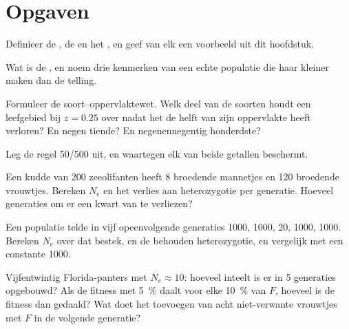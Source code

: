 \section{Opgaven}

\begin{exercise}[$\star$]\label{exo:b3:conservation-biology:1}
Definieer de , de  en het , en geef van elk een voorbeeld uit dit
hoofdstuk.
\end{exercise}

\begin{exercise}[$\star$]\label{exo:b3:conservation-biology:2}
Wat is de , en noem drie kenmerken van een
echte populatie die haar kleiner maken dan de telling.
\end{exercise}

\begin{exercise}[$\star$]\label{exo:b3:conservation-biology:3}
Formuleer de soort--oppervlaktewet. Welk deel van de soorten houdt een
leefgebied bij $z = 0.25$ over nadat het de helft van zijn oppervlakte
heeft verloren? En negen tiende? En negenennegentig honderdste?
\end{exercise}

\begin{exercise}[$\star$]\label{exo:b3:conservation-biology:4}
Leg de regel 50/500 uit, en waartegen elk van beide getallen beschermt.
\end{exercise}

\begin{exercise}[$\star\star$]\label{exo:b3:conservation-biology:5}
Een kudde van 200 zeeolifanten heeft 8 broedende mannetjes en 120
broedende vrouwtjes. Bereken $N_{e}$ en het verlies aan heterozygotie
per generatie. Hoeveel generaties om er een kwart van te verliezen?
\end{exercise}

\begin{exercise}[$\star\star$]\label{exo:b3:conservation-biology:6}
Een populatie telde in vijf opeenvolgende generaties 1000, 1000, 20,
1000, 1000. Bereken $N_{e}$ over dat bestek, en de behouden
heterozygotie, en vergelijk met een constante 1000.
\end{exercise}

\begin{exercise}[$\star\star$]\label{exo:b3:conservation-biology:7}
Vijfentwintig Florida-panters met $N_{e} \approx 10$: hoeveel inteelt
is er in 5 generaties opgebouwd? Als de fitness met \qty{5}{\%} daalt
voor elke \qty{10}{\%} van $F$, hoeveel is de fitness dan gedaald? Wat
doet het toevoegen van acht niet-verwante vrouwtjes met $F$ in de
volgende generatie?
\end{exercise}

